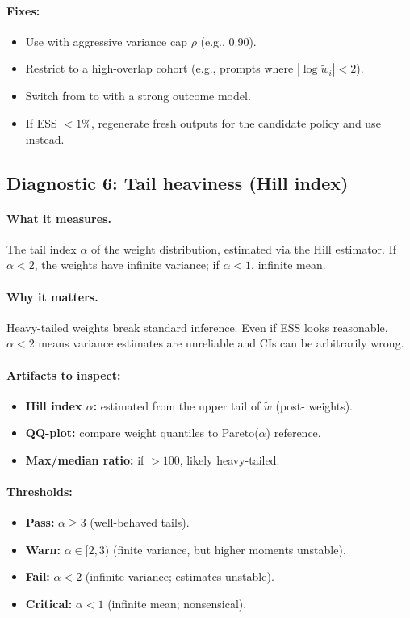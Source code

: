 \paragraph{Fixes:}
\begin{itemize}
\item Use \simcal{} with aggressive variance cap $\rho$ (e.g., 0.90).
\item Restrict to a high-overlap cohort (e.g., prompts where $|\log \tilde{w}_i| < 2$).
\item Switch from \ips{} to \dr{} with a strong outcome model.
\item If ESS $< 1\%$, regenerate fresh outputs for the candidate policy and use \dm{} instead.
\end{itemize}

\subsection{Diagnostic 6: Tail heaviness (Hill index)}

\paragraph{What it measures.} The tail index $\alpha$ of the weight distribution, estimated via the Hill estimator. If $\alpha < 2$, the weights have infinite variance; if $\alpha < 1$, infinite mean.

\paragraph{Why it matters.} Heavy-tailed weights break standard inference. Even if ESS looks reasonable, $\alpha < 2$ means variance estimates are unreliable and CIs can be arbitrarily wrong.

\paragraph{Artifacts to inspect:}
\begin{itemize}
\item \textbf{Hill index $\alpha$:} estimated from the upper tail of $\tilde{w}$ (post-\simcal{} weights).
\item \textbf{QQ-plot:} compare weight quantiles to Pareto($\alpha$) reference.
\item \textbf{Max/median ratio:} if $> 100$, likely heavy-tailed.
\end{itemize}

\paragraph{Thresholds:}
\begin{itemize}
\item \textbf{Pass:} $\alpha \ge 3$ (well-behaved tails).
\item \textbf{Warn:} $\alpha \in [2, 3)$ (finite variance, but higher moments unstable).
\item \textbf{Fail:} $\alpha < 2$ (infinite variance; estimates unstable).
\item \textbf{Critical:} $\alpha < 1$ (infinite mean; nonsensical).
\end{itemize}


